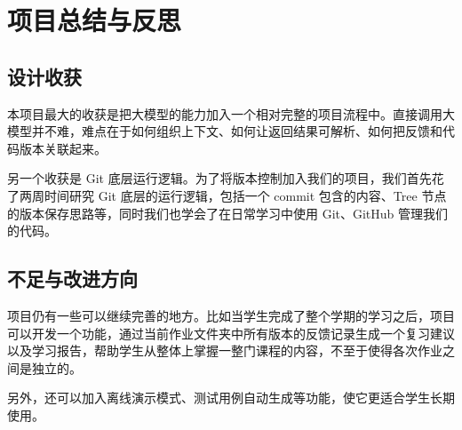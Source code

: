 \documentclass[UTF8,a4paper,11pt,fontset=fandol]{ctexart}
\begin{document}
\section{项目总结与反思}

\subsection{设计收获}

本项目最大的收获是把大模型的能力加入一个相对完整的项目流程中。直接调用大模型并不难，难点在于如何组织上下文、如何让返回结果可解析、如何把反馈和代码版本关联起来。

另一个收获是 Git 底层运行逻辑。为了将版本控制加入我们的项目，我们首先花了两周时间研究 Git 底层的运行逻辑，包括一个 commit 包含的内容、Tree 节点的版本保存思路等，同时我们也学会了在日常学习中使用 Git、GitHub 管理我们的代码。

\subsection{不足与改进方向}

项目仍有一些可以继续完善的地方。比如当学生完成了整个学期的学习之后，项目可以开发一个功能，通过当前作业文件夹中所有版本的反馈记录生成一个复习建议以及学习报告，帮助学生从整体上掌握一整门课程的内容，不至于使得各次作业之间是独立的。

另外，还可以加入离线演示模式、测试用例自动生成等功能，使它更适合学生长期使用。
\end{document}
